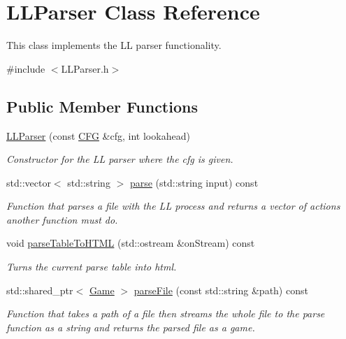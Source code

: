 \hypertarget{classLLParser}{}\section{L\+L\+Parser Class Reference}
\label{classLLParser}


This class implements the LL parser functionality.  




{\ttfamily \#include $<$L\+L\+Parser.\+h$>$}

\subsection*{Public Member Functions}
\begin{DoxyCompactItemize}
\item 
\hyperlink{classLLParser_aaa1f2511761d90253b2507a768aebf8a}{L\+L\+Parser} (const \hyperlink{classCFG}{C\+FG} \&cfg, int lookahead)
\begin{DoxyCompactList}\small\item\em Constructor for the LL parser where the cfg is given. \end{DoxyCompactList}\item 
std\+::vector$<$ std\+::string $>$ \hyperlink{classLLParser_a57e0b6627039a37977d17d8b915ee1ea}{parse} (std\+::string input) const
\begin{DoxyCompactList}\small\item\em Function that parses a file with the LL process and returns a vector of actions another function must do. \end{DoxyCompactList}\item 
void \hyperlink{classLLParser_ad56ae17adea4df70ced21f4299dd3429}{parse\+Table\+To\+H\+T\+ML} (std\+::ostream \&on\+Stream) const
\begin{DoxyCompactList}\small\item\em Turns the current parse table into html. \end{DoxyCompactList}\item 
std\+::shared\+\_\+ptr$<$ \hyperlink{classGame}{Game} $>$ \hyperlink{classLLParser_abfc94f8f8cc9230db87183008939dd23}{parse\+File} (const std\+::string \&path) const
\begin{DoxyCompactList}\small\item\em Function that takes a path of a file then streams the whole file to the parse function as a string and returns the parsed file as a game. \end{DoxyCompactList}\end{DoxyCompactItemize}


